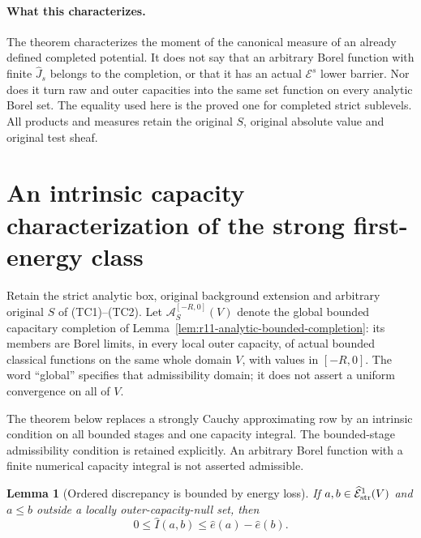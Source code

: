 \documentclass[11pt,a4paper]{article}
\numberwithin{equation}{section}
\newtheorem{lemma}[theorem]{Lemma}
\theoremstyle{definition}
\theoremstyle{remark}
\begin{document}
\paragraph{What this characterizes.}
The theorem characterizes the moment of the canonical measure
of an already defined completed potential. It does not say
that an arbitrary Borel function with finite $\widehat J_s$
belongs to the completion, or that it has an actual
$\mathcal E^s$ lower barrier. Nor does it turn raw and outer
capacities into the same set function on every analytic Borel
set. The equality used here is the proved one for completed
strict sublevels. All products and measures retain the original
$S$, original absolute value and original test sheaf.



\section{An intrinsic capacity characterization of the strong first-energy class}
\label{sec:r11-intrinsic-first-energy-characterization}

Retain the strict analytic box, original background extension and
arbitrary original $S$ of (TC1)--(TC2). Let
$\mathcal A_S^{[-R,0]}(V)$ denote the global bounded capacitary
completion of Lemma~\ref{lem:r11-analytic-bounded-completion}:
its members are Borel limits, in every local outer capacity,
of actual bounded classical functions on the same whole domain
$V$, with values in $[-R,0]$.
The word ``global'' specifies that admissibility domain; it
does not assert a uniform convergence on all of $V$.

The theorem below replaces a strongly Cauchy approximating row
by an intrinsic condition on all bounded stages and one
capacity integral. The bounded-stage admissibility condition
is retained explicitly. An arbitrary Borel function with a
finite numerical capacity integral is not asserted admissible.

\begin{lemma}[Ordered discrepancy is bounded by energy loss]
\label{lem:r11-ordered-completed-discrepancy}
If $a,b\in\widehat{\mathcal E}^1_{\rm str}(V)$ and
$a\leq b$ outside a locally outer-capacity-null set, then
\[
       0\leq\widehat I(a,b)
                            \leq\widehat e(a)-\widehat e(b).
 \tag{CI1}
\]
\end{lemma}
\end{document}
